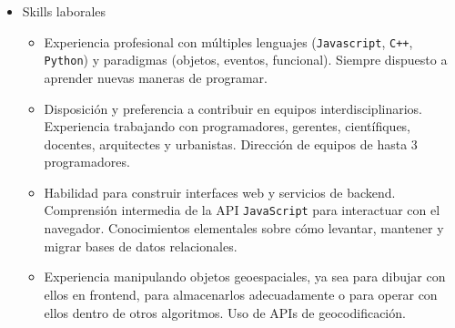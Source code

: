 \documentclass[a4paper]{article}
\begin{document}
\begin{itemize}
\begin{itemize}
    \item
      Programador lead @ \textit{UrbanSim} entre julio 2018 y noviembre 2020.
      \newline
      Inicialmente extensión de generador procedural de vivienda asequible
      multifamiliar luego desarrollo de plataforma web envolvente.

    \item
      Programador freelance @ \textit{LIAA, FCEyN, UBA} durante primer mitad
      de 2018.  \newline
      Exploración del uso de eye tracking al estudio de atención en navegadores
      web.

    \item
      Programador junior @ \textit{Eryx} durante 4 meses a principios de 2016.

    \item
      Ayudante de cocina y mozo @ \textit{La Capelina, San Fernando} durante
      veranos 2012 y 2013.

  \end{itemize}

  \item Skills laborales
  \begin{itemize}

    \item
      Experiencia profesional con múltiples lenguajes (\texttt{Javascript},
      \texttt{C}\verb|++|, \texttt{Python}) y paradigmas (objetos, eventos,
      funcional). \newline
      Siempre dispuesto a aprender nuevas maneras de programar.

    \item
      Disposición y preferencia a contribuir en equipos interdisciplinarios.
      \newline
      Experiencia trabajando con programadores, gerentes, científiques,
      docentes, arquitectes y urbanistas. \newline
      Dirección de equipos de hasta 3 programadores.

    \item
      Habilidad para construir interfaces web y servicios de backend. \newline
      Comprensión intermedia de la API \texttt{JavaScript} para interactuar con
      el navegador. \newline
      Conocimientos elementales sobre cómo levantar, mantener y migrar bases de
      datos relacionales.

    \item
      Experiencia manipulando objetos geoespaciales, ya sea para dibujar con
      ellos en frontend, para almacenarlos adecuadamente o para operar con
      ellos dentro de otros algoritmos. \newline
      Uso de APIs de geocodificación.


\end{itemize}
\end{itemize}
\end{document}
